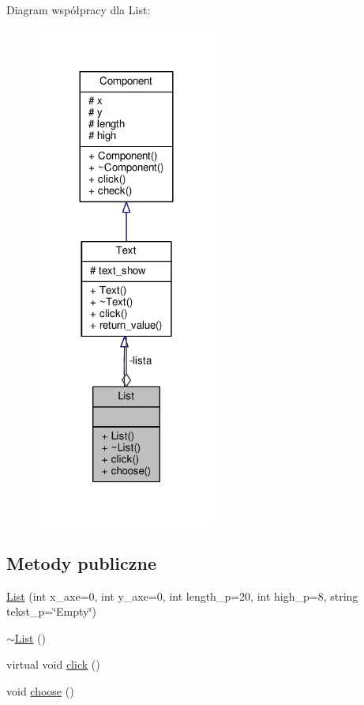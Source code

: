 Diagram współpracy dla List\+:
\nopagebreak
\begin{figure}[H]
\begin{center}
\leavevmode
\includegraphics[width=168pt]{classList__coll__graph}
\end{center}
\end{figure}
\subsection*{Metody publiczne}
\begin{DoxyCompactItemize}
\item 
\hyperlink{classList_a461d7b92539ae6cd32801a93ef25c770}{List} (int x\+\_\+axe=0, int y\+\_\+axe=0, int length\+\_\+p=20, int high\+\_\+p=8, string tekst\+\_\+p=\char`\"{}Empty\char`\"{})
\item 
\hyperlink{classList_a70aecf37bd9d779a394e4d50377fbf5f}{$\sim$\+List} ()
\item 
virtual void \hyperlink{classList_a72af1f829c9b4ca5ee3cb3eaae52cf9a}{click} ()
\item 
void \hyperlink{classList_a0fd3881c847af3dd93bbc1927c2fff46}{choose} ()
\end{DoxyCompactItemize}
